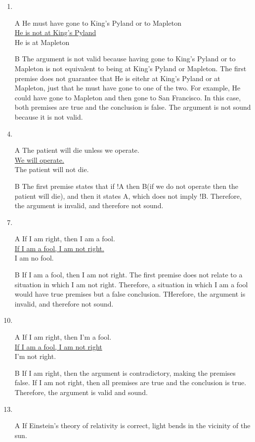 \documentclass{article}
\begin{document}
\begin{enumerate}
\item
\item[A]
He must have gone to King's Pyland or to Mapleton
\\\underline{He is not at King's Pyland}
\\He is at Mapleton
\item[B]
The argument is not valid because having gone to King's Pyland or to Mapleton is not equivalent to being at King's Pyland or Mapleton. The first premise does not guarantee that He is eitehr at King's Pyland or at Mapleton, just that he must have gone to one of the two. For example, He could have gone to Mapleton and then gone to San Francisco. In this case, both premises are true and the conclusion is false. The argument is not sound because it is not valid.
\item
\item[A]
The patient will die unless we operate.
\\\underline{We will operate.}
\\The patient will not die.
\item[B]
The first premise states that if !A then B(if we do not operate then the patient will die), and then it states A, which does not imply !B. Therefore, the argument is invalid, and therefore not sound. 
\item
\item[A]
If I am right, then I am a fool.
\\\underline{If I am a fool, I am not right.} 
\\I am no fool.
\item[B]
If I am a fool, then I am not right. The first premise does not relate to a situation in which I am not right. Therefore, a situation in which I am a fool would have true premises but a false conclusion. THerefore, the argument is invalid, and therefore not sound.
\item
\item[A]
If I am right, then I'm a fool.
\\\underline{If I am a fool, I am not right}
\\I'm not right.
\item[B]
If I am right, then the argument is contradictory, making the premises false. If I am not right, then all premises are true and the conclusion is true. Therefore, the argument is valid and sound.
\item
\item[A]
If Einstein's theory of relativity is correct, light bends in the vicinity of the sun.

\end{enumerate}
\end{document}
